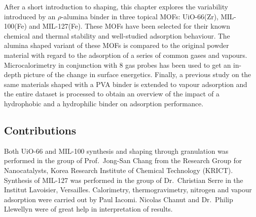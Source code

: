 After a short introduction to shaping, this chapter explores the 
variability introduced by an \( \rho \)-alumina binder in three 
topical \glspl{MOF}: UiO-66(Zr), MIL-100(Fe) and MIL-127(Fe). These \glspl{MOF} 
have been selected for their known chemical and thermal stability 
and well-studied adsorption behaviour.
The alumina shaped variant of these \glspl{MOF} is compared to the original
powder material with regard to the adsorption of a series of common
gases and vapours. Microcalorimetry in conjunction with 8 gas probes
has been used to get an in-depth picture of the change in surface
energetics.
Finally, a previous study on the same materials shaped with a \gls{PVA}
binder is extended to vapour adsorption and the entire
dataset is processed to obtain an overview of the impact of a
hydrophobic and a hydrophilic binder on adsorption performance.

\subsection*{Contributions}

Both UiO-66 and MIL-100 synthesis and shaping through granulation was performed
in the group of Prof.\ Jong-San Chang from the Research Group for Nanocatalysts,
Korea Research Institute of Chemical Technology (KRICT). Synthesis 
of MIL-127 was performed in the group of Dr.\ Christian Serre in 
the Institut Lavoisier, Versailles. Calorimetry,
thermogravimetry, nitrogen and vapour adsorption were carried out by
Paul Iacomi. Nicolas Chanut and Dr.\ Philip Llewellyn were of great help
in interpretation of results.

